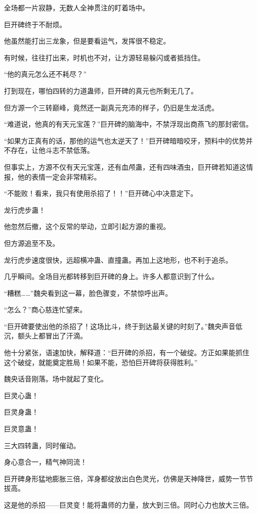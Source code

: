 \begin{this_body}
全场都一片寂静，无数人全神贯注的盯着场中。

巨开碑终于不耐烦。

他虽然能打出三龙象，但是要看运气，发挥很不稳定。

有时候，往往打出来，时机也不对，让方源轻易躲闪或者抵挡住。

“他的真元怎么还不耗尽？”

打到现在，哪怕四转的力道蛊师，巨开碑的真元也所剩无几了。

但方源一个三转巅峰，竟然还一副真元充沛的样子，仍旧是生龙活虎。

“难道说，他真的有天元宝莲？”巨开碑的脑海中，不禁浮现出商燕飞的那封密信。

“如果方正真有的话，那他的运气也太逆天了！”巨开碑暗暗咬牙，预料中的优势并不存在，让他斗志不禁低落。

但事实上，方源不仅有天元宝莲，还有血颅蛊，还有四味酒虫，巨开碑若知道这情报，他的表情一定会非常精彩。

“不能败！看来，我只有使用杀招了！！”巨开碑心中决意定下。

龙行虎步蛊！

他忽然后撤，这个反常的举动，立即引起方源的重视。

但方源追至不及。

龙行虎步速度很快，远超横冲蛊、直撞蛊。再加上这地形，也不利于追杀。

几乎瞬间。全场目光都转移到巨开碑的身上。许多人都意识到了什么。

“糟糕……”魏央看到这一幕，脸色骤变，不禁惊呼出声。

“怎么？”商心慈连忙望来。

“巨开碑要使出他的杀招了！这场比斗，终于到达最关键的时刻了。”魏央声音低沉，额头上都冒出了汗滴。

他十分紧张，语速加快，解释道：“巨开碑的杀招，有一个破绽。方正如果能抓住这个破绽，就能奠定胜局！如果不能，恐怕巨开碑将获得胜利。”

魏央话音刚落。场中就起了变化。

巨灵心蛊！

巨灵身蛊！

巨灵意蛊！

三大四转蛊，同时催动。

身心意合一，精气神同流！

巨开碑身形猛地膨胀三倍，浑身都绽放出白色灵光，仿佛是天神降世，威势一节节拔高。

这是他的杀招——巨灵变！能将蛊师的力量，放大到三倍。同时心力也放大三倍。


\end{this_body}
